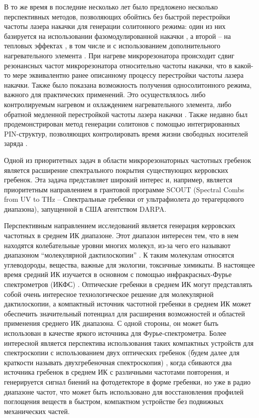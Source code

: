 В то же время в последние несколько лет было предложено несколько перспективных методов, позволяющих обойтись без быстрой перестройки частоты лазера накачки для генерации солитонного режима: один из них базируется на использовании фазомодулированной накачки \cite{Taheri2015,Jang2015ol}, а второй – на тепловых эффектах \cite{Kobatake2016}, в том числе и с использованием дополнительного нагревательного элемента \cite{Joshi2016}. При нагреве микрорезонатора происходит сдвиг резонансных частот микрорезонатора относительно частоты накачки, что в какой-то мере эквивалентно ранее описанному процессу перестройки частоты лазера накачки. Также было показана возможность получения односолитонного режима, важного для практических применений. Это осуществлялось либо контролируемым нагревом и охлаждением нагревательного элемента, либо обратной медленной перестройкой частоты лазера накачки
 \cite{Karpov2017}. Также недавно был продемонстрирован метод генерации солитонов с помощью интегрированных PIN-структур, позволяющих контролировать время жизни свободных носителей заряда \cite{Yu2016}.


Одной из приоритетных задач в области микрорезонаторных частотных гребенок является расширение спектрального покрытия существующих керровских гребенок. Эта задача представляет широкий интерес и, например, является приоритетным направлением в грантовой программе SCOUT (Spectral Combs from UV to THz – Спектральные гребенки от ультрафиолета до терагерцового диапазона), запущенной в США агентством DARPA.


Перспективным направлением исследований является генерация керровских частотных в среднем ИК диапазоне. Этот диапазон интересен тем, что в нем находятся колебательные уровни многих молекул, из-за чего его называют диапазоном “молекулярной дактилоскопии” \cite{Diddams2007}. К таким молекулам относятся углеводороды, вещества, важные для экологии, токсичные химикаты. В настоящее время средний ИК изучается в основном с помощью инфракрасных-Фурье спектрометров (ИКФС) \cite{Griffiths2006}. Оптические гребенки в среднем ИК могут представлять собой очень интересное технологическое решение для молекулярной дактилоскопии, а компактный источник частотной гребенки в среднем ИК может обеспечить значительный потенциал для расширения возможностей и областей применения среднего ИК диапазона. С одной стороны, он может быть использован в качестве яркого источника для Фурье-спектрометра. Более интересной является перспектива использования таких компактных устройств для спектроскопии с использованием двух оптических гребенок (будем далее для краткости называть двухгребеночная спектроскопия) \cite{Ideguchi2014,Coddington2016,Suh2016}, когда сбиваются два источника гребенок в среднем ИК с различными частотами повторения, и генерируется сигнал биений на фотодетекторе в форме гребенки, но уже в радио диапазоне частот, что может быть использовано для восстановления профилей поглощения веществ в быстром, компактном устройстве без подвижных механических частей.


